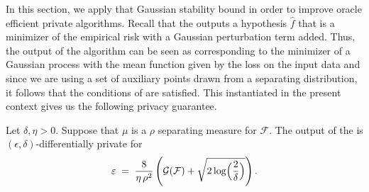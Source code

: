 

\iftoggle{colt}{
\section{Proof of \Cref{thm:main_privacy}}
}{
    \subsection{Differential Privacy Proofs}
}
\label{sec:proof_main_privacy}








    
    In this section, we apply that Gaussian stability bound in order to improve oracle efficient private algorithms. 
    Recall that the  outputs a hypothesis $\hat{f}$ that is a minimizer of the empirical risk with a Gaussian perturbation term added. 
    Thus, the output of the algorithm can be seen as corresponding to the minimizer of a Gaussian process with the mean function given by the loss on the input data and since we are using a set of auxiliary points drawn from a separating distribution, it follows that the conditions of  are satisfied.
    This instantiated in the present context gives us the following privacy guarantee.
    
    \begin{lemma}\label{lem:privacy_perturbed}
        Let $\delta, \eta > 0$.  
        Suppose that $\mu$ is a $\rho$ separating measure for $\mathcal{F}$.
        The output of the  is $(\epsilon, \delta)$-differentially private for 
        \begin{align}
              \epsilon \;=\; \frac{8}{\eta\, \rho^2} \left(  \mathcal{G}( \mathcal{F})  + \sqrt{2\log\Bigl(\frac{2}{\delta}\Bigr)} \right).
        \end{align} 
    \end{lemma}
    
